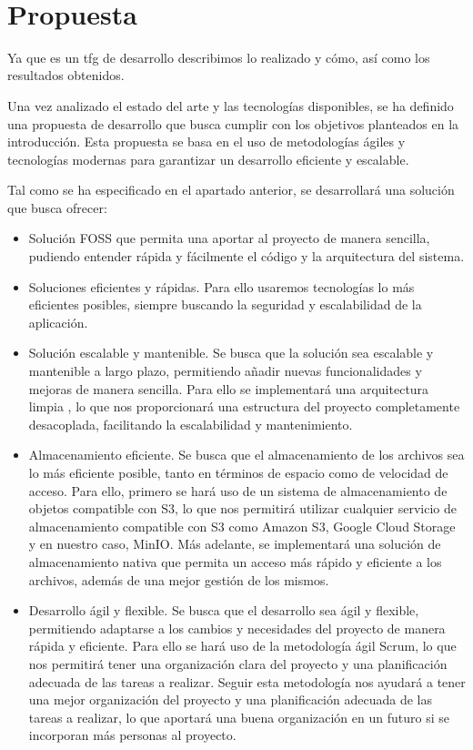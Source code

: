 \newpage
~
\newpage
\section{Propuesta}
Ya que es un tfg de desarrollo describimos lo realizado y cómo, así como los resultados obtenidos.

Una vez analizado el estado del arte y las tecnologías disponibles, se ha definido una propuesta de desarrollo que busca cumplir con los objetivos planteados en la introducción. Esta propuesta se basa en el uso de metodologías ágiles y tecnologías modernas para garantizar un desarrollo eficiente y escalable.

Tal como se ha especificado en el apartado anterior, se desarrollará una solución que busca ofrecer:
\begin{itemize}
    \item Solución FOSS que permita una aportar al proyecto de manera sencilla, pudiendo entender rápida y fácilmente el código y la arquitectura del sistema.
    \item Soluciones eficientes y rápidas. Para ello usaremos tecnologías lo más eficientes posibles, siempre buscando la seguridad y escalabilidad de la aplicación.
    \item Solución escalable y mantenible. Se busca que la solución sea escalable y mantenible a largo plazo, permitiendo añadir nuevas funcionalidades y mejoras de manera sencilla. Para ello se implementará una arquitectura limpia \parencite{uncle-bob-clean-architecture}, lo que nos proporcionará una estructura del proyecto completamente desacoplada, facilitando la escalabilidad y mantenimiento.
    \item Almacenamiento eficiente. Se busca que el almacenamiento de los archivos sea lo más eficiente posible, tanto en términos de espacio como de velocidad de acceso.
        Para ello, primero se hará uso de un sistema de almacenamiento de objetos compatible con S3, lo que nos permitirá utilizar cualquier servicio de almacenamiento compatible con S3 como Amazon S3, Google Cloud Storage y en nuestro caso, MinIO.
        Más adelante, se implementará una solución de almacenamiento nativa que permita un acceso más rápido y eficiente a los archivos, además de una mejor gestión de los mismos.
    \item Desarrollo ágil y flexible. Se busca que el desarrollo sea ágil y flexible, permitiendo adaptarse a los cambios y necesidades del proyecto de manera rápida y eficiente. Para ello se hará uso de la metodología ágil Scrum, lo que nos permitirá tener una organización clara del proyecto y una planificación adecuada de las tareas a realizar.
        Seguir esta metodología nos ayudará a tener una mejor organización del proyecto y una planificación adecuada de las tareas a realizar, lo que aportará una buena organización en un futuro si se incorporan más personas al proyecto.
\end{itemize}

